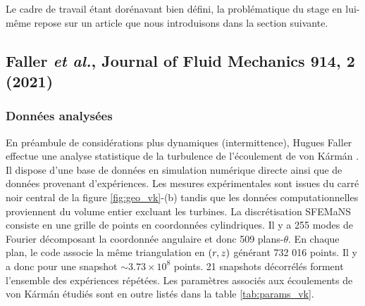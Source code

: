 \documentclass[13pt, a4paper]{extarticle}
\begin{document}
\noindent Le cadre de travail étant dorénavant bien défini, la problématique du 
stage en lui-même repose
sur un article que nous introduisons dans la section suivante. 

\subsection{Faller \emph{et al.}, Journal of Fluid Mechanics {\bf 914}, 2 (2021)}
\subsubsection{Données analysées}\label{sec:stat_faller}
\noindent En préambule de considérations plus dynamiques (intermittence), 
Hugues Faller effectue une analyse statistique de la turbulence de 
l'écoulement de von Kármán \cite{Faller-Intermittency}.
Il dispose d'une base de données en simulation numérique directe
ainsi que de données provenant d'expériences. Les mesures expérimentales sont issues
du carré noir central de la figure \ref{fig:geo_vk}-(b) tandis que les données
computationnelles proviennent du volume entier excluant les turbines. La discrétisation
SFEMaNS consiste en une grille de points en coordonnées cylindriques. Il y a 255 modes
de Fourier décomposant la coordonnée angulaire et donc 509 plans-$\theta$. En chaque plan,
le code associe la même triangulation en $\qty(r,z)$ générant 732 016 points. Il y a donc pour une
snapshot $\sim 3.73 \times 10^8$ points. 21 snapshots décorrélés forment l'ensemble des expériences répétées.
Les paramètres associés aux écoulements de von Kármán étudiés sont en outre listés
dans la table \ref{tab:params_vk}.
\end{document}
